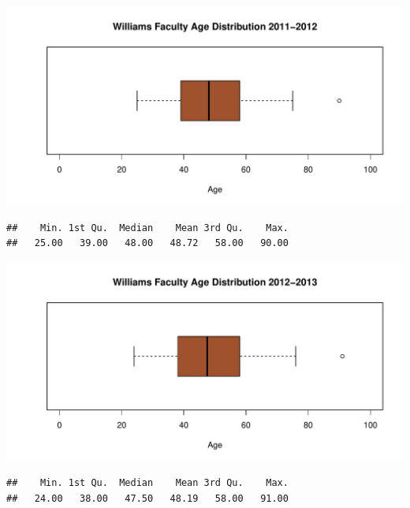 \documentclass[12pt,a4paper]{article}\usepackage[]{graphicx}\usepackage[]{color}
\makeatletter
\def\maxwidth{ %
  \ifdim\Gin@nat@width>\linewidth
    \linewidth
  \else
    \Gin@nat@width
  \fi
}
\newenvironment{kframe}{%
 \def\at@end@of@kframe{}%
 \ifinner\ifhmode%
  \def\at@end@of@kframe{\end{minipage}}%
  \begin{minipage}{\columnwidth}%
 \fi\fi%
 \def\FrameCommand##1{\hskip\@totalleftmargin \hskip-\fboxsep
 \colorbox{shadecolor}{##1}\hskip-\fboxsep
     \hskip-\linewidth \hskip-\@totalleftmargin \hskip\columnwidth}%
 \MakeFramed {\advance\hsize-\width
   \@totalleftmargin\z@ \linewidth\hsize
   \@setminipage}}%
 {\par\unskip\endMakeFramed%
 \at@end@of@kframe}
\newenvironment{knitrout}{}{} %
\theoremstyle{definition}
\makeatother
\begin{document}
\begin{knitrout}
\color{fgcolor}
\includegraphics[width=\maxwidth]{figure/unnamed-chunk-28-1} 

\end{knitrout}

\begin{knitrout}
\color{fgcolor}\begin{kframe}
\begin{verbatim}
##    Min. 1st Qu.  Median    Mean 3rd Qu.    Max. 
##   25.00   39.00   48.00   48.72   58.00   90.00
\end{verbatim}
\end{kframe}
\end{knitrout}



\begin{knitrout}
\color{fgcolor}
\includegraphics[width=\maxwidth]{figure/unnamed-chunk-30-1} 

\end{knitrout}

\begin{knitrout}
\color{fgcolor}\begin{kframe}
\begin{verbatim}
##    Min. 1st Qu.  Median    Mean 3rd Qu.    Max. 
##   24.00   38.00   47.50   48.19   58.00   91.00
\end{verbatim}
\end{kframe}
\end{knitrout}
\end{document}
